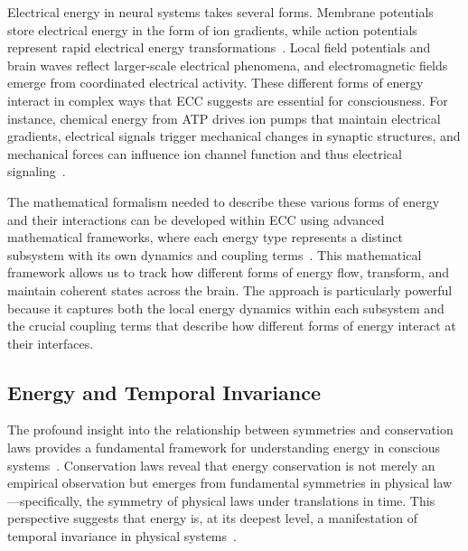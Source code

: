 Electrical energy in neural systems takes several forms. Membrane potentials store electrical energy in the form of ion gradients, while action potentials represent rapid electrical energy transformations~\cite{pinotsis2023vivo}. Local field potentials and brain waves reflect larger-scale electrical phenomena, and electromagnetic fields emerge from coordinated electrical activity. These different forms of energy interact in complex ways that ECC suggests are essential for consciousness. For instance, chemical energy from ATP drives ion pumps that maintain electrical gradients, electrical signals trigger mechanical changes in synaptic structures, and mechanical forces can influence ion channel function and thus electrical signaling~\cite{hunt2024electromagnetic}.

The mathematical formalism needed to describe these various forms of energy and their interactions can be developed within ECC using advanced mathematical frameworks, where each energy type represents a distinct subsystem with its own dynamics and coupling terms~\cite{da2024mathematical}. This mathematical framework allows us to track how different forms of energy flow, transform, and maintain coherent states across the brain. The approach is particularly powerful because it captures both the local energy dynamics within each subsystem and the crucial coupling terms that describe how different forms of energy interact at their interfaces.

\subsection*{Energy and Temporal Invariance~}

The profound insight into the relationship between symmetries and conservation laws provides a fundamental framework for understanding energy in conscious systems~\cite{landauer1996}. Conservation laws reveal that energy conservation is not merely an empirical observation but emerges from fundamental symmetries in physical law—specifically, the symmetry of physical laws under translations in time. This perspective suggests that energy is, at its deepest level, a manifestation of temporal invariance in physical systems~\cite{zheng2025unbearable}.

